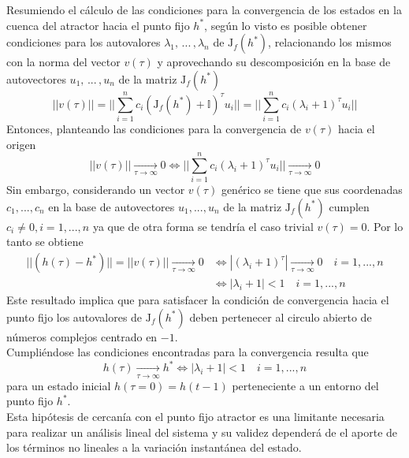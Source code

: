 \documentclass{article}
\begin{document}
	Resumiendo el cálculo de las condiciones para la convergencia de los estados en la cuenca del atractor hacia el punto fijo $h^*$, según lo visto es posible obtener condiciones para los autovalores $\lambda_1, \,... \,, \lambda_n$ de $\mathrm{J}_f(h^*)$, relacionando los mismos con la norma del vector $v(\tau)$ y aprovechando su descomposición en la base de autovectores ${ u_1, \,... \,, u_n }$ de la matriz $\mathrm{J}_f(h^*)$
	\begin{equation*}
	||v(\tau)||  = || \sum_{i=1}^{n} c_i  (\mathrm{J}_f(h^*) + \mathbb{I})^\tau u_i|| = || \sum_{i=1}^{n} c_i  (\lambda_i + 1)^\tau u_i||
	\end{equation*}
	Entonces, planteando las condiciones para la convergencia de $v(\tau)$ hacia el origen
	\begin{equation*}
	||v(\tau)|| \xrightarrow[\tau \to \infty]{} 0 \iff || \sum_{i=1}^{n} c_i  (\lambda_i + 1)^\tau u_i|| \xrightarrow[\tau \to \infty]{} 0
	\end{equation*}
	Sin embargo, considerando un vector $v(\tau)$ genérico se tiene que sus coordenadas $c_1, ... , c_n$ en la base de autovectores ${ u_1, ... , u_n }$ de la matriz $\mathrm{J}_f(h^*)$ cumplen $c_i \neq 0, i = 1, ..., n$ ya que de otra forma se tendría el caso trivial $v(\tau) = 0$. Por lo tanto se obtiene
	\begin{equation*}
	\begin{split}
	||(h(\tau) - h^*)|| = ||v(\tau)|| \xrightarrow[\tau \to \infty]{} 0 &\iff |(\lambda_i + 1)^\tau| \xrightarrow[\tau \to \infty]{} 0 \quad i = 1, ..., n\\
	&\iff |\lambda_i + 1| < 1 \quad i = 1, ..., n
	\end{split}
	\end{equation*}
	Este resultado implica que para satisfacer la condición de convergencia hacia el punto fijo los autovalores de $\mathrm{J}_f(h^*)$ deben pertenecer al circulo abierto de números complejos centrado en $-1$.\\
	Cumpliéndose las condiciones encontradas para la convergencia resulta que
	\begin{equation*}
	h(\tau) \xrightarrow[\tau \to \infty]{} h^* \iff |\lambda_i + 1| < 1 \quad i = 1, ..., n
	\end{equation*}
	para un estado inicial $h(\tau = 0) = h(t-1)$ perteneciente a un entorno del punto fijo $h^*$. \\
	Esta hipótesis de cercanía con el punto fijo atractor es una limitante necesaria para realizar un análisis lineal del sistema y su validez dependerá de el aporte de los términos no lineales a la variación instantánea del estado.\\
\end{document}
